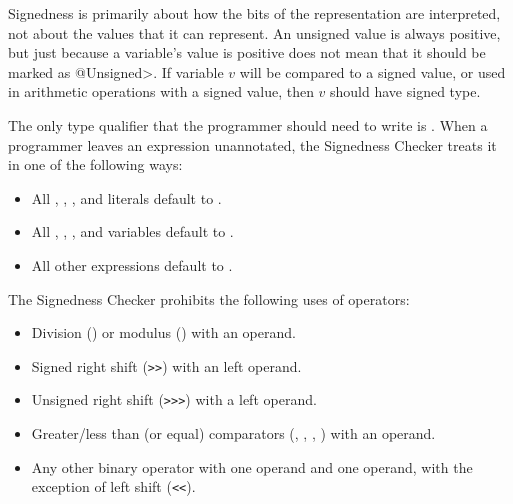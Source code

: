 Signedness is primarily about how the bits of the representation are
interpreted, not about the values that it can represent.  An unsigned value
is always positive, but just because a variable's value is positive does
not mean that it should be marked as \<@Unsigned>.  If variable $v$ will be
compared to a signed value, or used in arithmetic operations with a signed
value, then $v$ should have signed type.



The only type qualifier that the programmer should need to write is
.
When a programmer leaves an expression unannotated, the
Signedness Checker treats it in one of the following ways:

\begin{itemize}

    \item
    All , , , and  literals default
    to .
    \item
    All , , , and  variables default
    to .
    \item
    All other expressions default to .

\end{itemize}



The Signedness Checker prohibits the following uses of operators:

\begin{itemize}

    \item
    Division (\code{/}) or modulus (\code{\%}) with an 
    operand.
    \item
    Signed right shift (\verb|>>|) with an  left operand.
    \item
    Unsigned right shift (\verb|>>>|) with a  left operand.
    \item
    Greater/less than (or equal) comparators
    (\code{<}, \code{<=}, \code{>}, \code{>=}) with an 
    operand.
    \item
    Any other binary operator with one  operand and one
     operand, with the exception of left shift (\verb|<<|).

\end{itemize}


